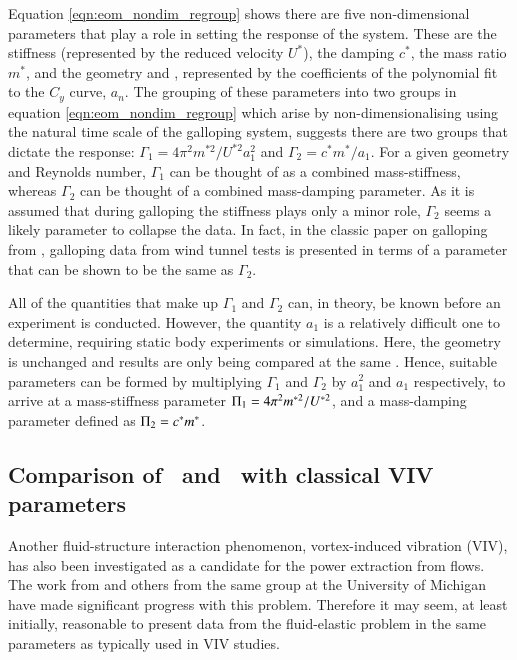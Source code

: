 Equation \ref{eqn:eom_nondim_regroup} shows there are five non-dimensional parameters that play a role in setting the response of the system. These are the stiffness (represented by the reduced velocity $U^*$), the damping $c^*$, the mass ratio $m^*$, and the geometry and \reynoldsnumber, represented by the coefficients of the polynomial fit to the $C_y$ curve, $a_n$. The grouping of these parameters into two groups in equation \ref{eqn:eom_nondim_regroup} which arise by non-dimensionalising using the natural time scale of the galloping system, suggests there are two groups that dictate the response: $\Gamma_1 = 4\pi^2m^{*2}/U^{*2}a_1^2$ and $\Gamma_2 = c^*m^*/a_1$. For a given geometry and Reynolds number, $\Gamma_1$ can be thought of as a combined mass-stiffness, whereas $\Gamma_2$ can be thought of a combined mass-damping parameter. As it is assumed that during galloping the stiffness plays only a minor role, $\Gamma_2$ seems a likely parameter to collapse the data. In fact, in the classic paper on galloping from \cite{Parkinson1964}, galloping data from wind tunnel tests is presented in terms of a parameter that can be shown to be the same as $\Gamma_2$.
 
 All of the quantities that make up $\Gamma_1$ and $\Gamma_2$ can, in theory, be known before an experiment is conducted. However, the quantity $a_1$ is a relatively difficult one to determine, requiring static body experiments or simulations. Here, the geometry is unchanged and results are only being compared at the same \reynoldsnumber. Hence, suitable parameters can be formed by multiplying $\Gamma_1$ and $\Gamma_2$ by $a_1^2$ and $a_1$ respectively, to arrive at a mass-stiffness parameter $\Pi_1 =  4\pi^2m^{*2}/U^{*2}$, and a mass-damping parameter defined as $\Pi_2 = c^*m^*$.
 
 \subsection{Comparison of \massstiff \ and \massdamp \ with classical VIV parameters}
\label{sec:new_vs_viv}

Another fluid-structure interaction phenomenon, vortex-induced vibration (VIV), has also been investigated as a candidate for the power extraction from flows. The work from \citet{Bernitsas2008a-concept, Bernitsas2009, Raghavan2010a, Lee2011b} and others from the same group at the University of Michigan have made significant progress with this problem. Therefore it may seem, at least initially, reasonable to present data from the fluid-elastic problem in the same parameters as typically used in VIV studies.
  
